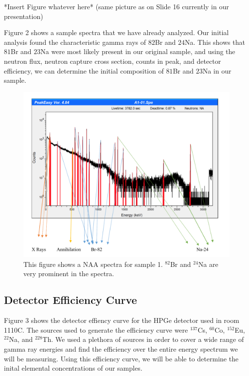 \documentclass[]{article}
\begin{document}
*Insert Figure whatever here* (same picture as on Slide 16 currently in our presentation)



Figure 2 shows a sample spectra that we have already analyzed. Our initial analysis found the characteristic gamma rays of ${82}$Br and ${24}$Na. This shows that ${81}$Br and ${23}$Na were most likely present in our original sample, and using the neutron flux, neutron capture cross section, counts in peak, and detector efficiency, we can determine the initial composition of ${81}$Br and ${23}$Na in our sample.

\begin{figure}[h]
\centering
\includegraphics[scale=0.5]{ExampleSpectra}
\caption{This figure shows a NAA spectra for sample 1. $^{82}$Br and $^{24}$Na are very prominent in the spectra.}
\end{figure} 

\pagebreak


\subsection{Detector Efficiency Curve}

Figure 3 shows the detector effiency curve for the HPGe detector used in room 1110C. The sources used to generate the efficiency curve were $^{137}$Cs, $^{60}$Co, $^{152}$Eu, $^{22}$Na, and $^{228}$Th. We used a plethora of sources in order to cover a wide range of gamma ray energies and find the efficiency over the entire energy spectrum we will be measuring. Using this efficiency curve, we will be able to determine the inital elemental concentrations of our samples.
\end{document}
